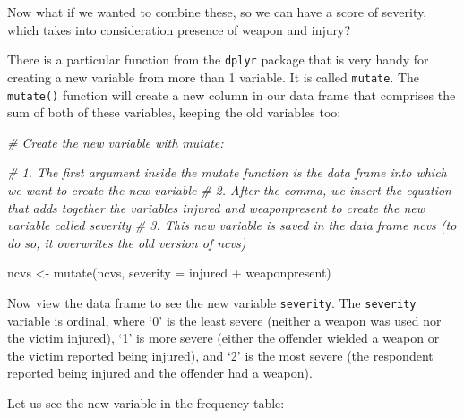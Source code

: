 \documentclass[
]{book}
\newenvironment{Shaded}{\begin{snugshade}}{\end{snugshade}}
\newcommand{\AttributeTok}[1]{\textcolor[rgb]{0.77,0.63,0.00}{#1}}
\newcommand{\CommentTok}[1]{\textcolor[rgb]{0.56,0.35,0.01}{\textit{#1}}}
\newcommand{\FunctionTok}[1]{\textcolor[rgb]{0.00,0.00,0.00}{#1}}
\newcommand{\NormalTok}[1]{#1}
\newcommand{\OtherTok}[1]{\textcolor[rgb]{0.56,0.35,0.01}{#1}}
\newcommand{\SpecialCharTok}[1]{\textcolor[rgb]{0.00,0.00,0.00}{#1}}
\begin{document}
Now what if we wanted to combine these, so we can have a score of severity, which takes into consideration presence of weapon and injury?

There is a particular function from the \texttt{dplyr} package that is very handy for creating a new variable from more than 1 variable. It is called \texttt{mutate}. The \texttt{mutate()} function will create a new column in our data frame that comprises the sum of both of these variables, keeping the old variables too:

\begin{Shaded}
\begin{Highlighting}[]
\CommentTok{\# Create the new variable with mutate: }

\CommentTok{\# 1. The first argument inside the \textasciigrave{}mutate\textasciigrave{} function is the data frame into which we want to create the new variable}
\CommentTok{\# 2. After the comma, we insert the equation that adds together the variables \textquotesingle{}injured\textquotesingle{} and \textquotesingle{}weaponpresent\textquotesingle{} to create the new variable called \textquotesingle{}severity\textquotesingle{}}
\CommentTok{\# 3. This new variable is saved in the data frame \textasciigrave{}ncvs\textasciigrave{} (to do so, it overwrites the old version of \textquotesingle{}ncvs\textquotesingle{})}

\NormalTok{ncvs }\OtherTok{\textless{}{-}} \FunctionTok{mutate}\NormalTok{(ncvs, }\AttributeTok{severity =}\NormalTok{ injured }\SpecialCharTok{+}\NormalTok{ weaponpresent)}
\end{Highlighting}
\end{Shaded}

Now view the data frame to see the new variable \texttt{severity}. The \texttt{severity} variable is ordinal, where `0' is the least severe (neither a weapon was used nor the victim injured), `1' is more severe (either the offender wielded a weapon or the victim reported being injured), and `2' is the most severe (the respondent reported being injured and the offender had a weapon).

Let us see the new variable in the frequency table:

\begin{Shaded}
\end{Shaded}
\end{document}

